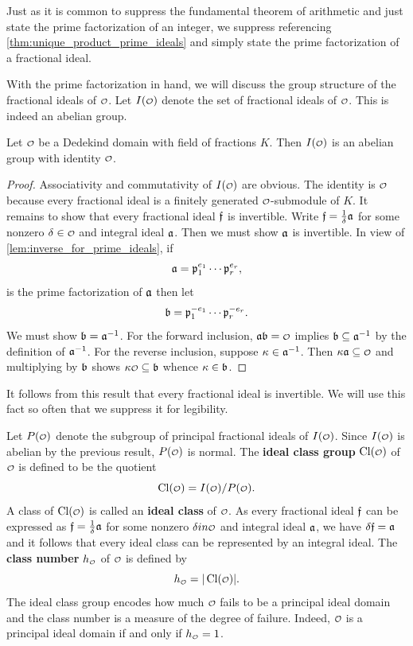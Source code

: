     Just as it is common to suppress the fundamental theorem of arithmetic and just state the prime factorization of an integer, we suppress referencing \cref{thm:unique_product_prime_ideals} and simply state the prime factorization of a fractional ideal.

    With the prime factorization in hand, we will discuss the group structure of the fractional ideals of \(\smc{O}\). Let \(I(\smc{O})\) denote the set of fractional ideals of \(\smc{O}\). This is indeed an abelian group.

    \begin{theorem}\label{thm:ideal_group_is_a_group}
      Let \(\smc{O}\) be a Dedekind domain with field of fractions \(K\). Then \(I(\smc{O})\) is an abelian group with identity \(\smc{O}\).
    \end{theorem}
    \begin{proof}
      Associativity and commutativity of \(I(\smc{O})\) are obvious. The identity is \(\smc{O}\) because every fractional ideal is a finitely generated \(\smc{O}\)-submodule of \(K\). It remains to show that every fractional ideal \(\mathfrak{f}\) is invertible. Write \(\mathfrak{f} = \frac{1}{\delta}\mathfrak{a}\) for some nonzero \(\d \in \smc{O}\) and integral ideal \(\mathfrak{a}\). Then we must show \(\mathfrak{a}\) is invertible. In view of \cref{lem:inverse_for_prime_ideals}, if
      \[
        \mathfrak{a} = \mathfrak{p}_{1}^{e_{1}} \cdots \mathfrak{p}_{r}^{e_{r}},
      \]
      is the prime factorization of \(\mathfrak{a}\) then let
      \[
        \mathfrak{b} = \mathfrak{p}_{1}^{-e_{1}} \cdots \mathfrak{p}_{r}^{-e_{r}}.
      \]
      We must show \(\mathfrak{b} = \mathfrak{a}^{-1}\). For the forward inclusion, \(\mf{a}\mf{b} = \smc{O}\) implies \(\mathfrak{b} \subseteq \mathfrak{a}^{-1}\) by the definition of \(\mathfrak{a}^{-1}\). For the reverse inclusion, suppose \(\kappa \in \mathfrak{a}^{-1}\). Then \(\k\mf{a} \subseteq \smc{O}\) and multiplying by \(\mathfrak{b}\) shows \(\k\smc{O} \subseteq \mf{b}\) whence \(\kappa \in \mathfrak{b}\).
    \end{proof}

    It follows from this result that every fractional ideal is invertible. We will use this fact so often that we suppress it for legibility. 
    
    Let \(P(\smc{O})\) denote the subgroup of principal fractional ideals of \(I(\smc{O})\). Since \(I(\smc{O})\) is abelian by the previous result, \(P(\smc{O})\) is normal. The \textbf{ideal class group} \(\Cl(\smc{O})\) of \(\smc{O}\) is defined to be the quotient
    \[
      \Cl(\smc{O}) = I(\smc{O})/P(\smc{O}).
    \]
    A class of \(\Cl(\smc{O})\) is called an \textbf{ideal class} of \(\smc{O}\). As every fractional ideal \(\mathfrak{f}\) can be expressed as \(\mathfrak{f} = \frac{1}{\delta}\mathfrak{a}\) for some nonzero \(\d in \smc{O}\) and integral ideal \(\mathfrak{a}\), we have \(\delta\mathfrak{f} = \mathfrak{a}\) and it follows that every ideal class can be represented by an integral ideal. The \textbf{class number} \(h_{\smc{O}}\) of \(\smc{O}\) is defined by
    \[
      h_{\smc{O}} = |\Cl(\smc{O})|.
    \]
    The ideal class group encodes how much \(\smc{O}\) fails to be a principal ideal domain and the class number is a measure of the degree of failure. Indeed, \(\smc{O}\) is a principal ideal domain if and only if \(h_{\smc{O}} = 1\).

